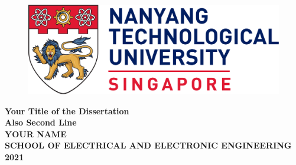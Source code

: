 \begin{titlepage}

\begin{figure}[h!]
\centering
\includegraphics[width=1\textwidth]{Title/NTU_logo.png}
\caption*{}
\label{fig:entropy} 
\end{figure}

\vspace{1.5in}

\centering
\Huge{\textbf{Your Title of the Dissertation\\Also Second Line}}\\[2.5in]

\LARGE{\textbf{YOUR NAME}}\\[0.5in]

\normalsize{\textbf{SCHOOL OF ELECTRICAL AND ELECTRONIC ENGINEERING}}\\[0.2in]


\large{\textbf{2021}}
\end{titlepage}
\newpage